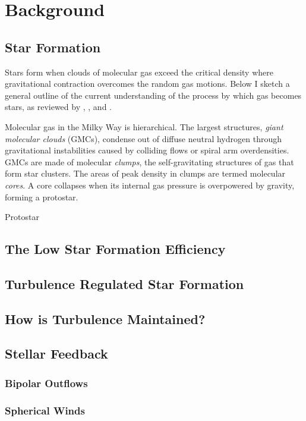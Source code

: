 \section{Background}

\subsection{Star Formation}
Stars form when clouds of molecular gas exceed the critical density where gravitational contraction overcomes the random gas motions. Below I sketch a general outline of the current understanding of the process by which gas becomes stars, as reviewed by \cite{McKee_2007}, \cite{Draine11}, and \cite{Dunham_2014}. 

Molecular gas in the Milky Way is hierarchical. The largest structures, \textit{giant molecular clouds} (GMCs), condense out of diffuse neutral hydrogen through gravitational instabilities caused by colliding flows or spiral arm overdensities. GMCs are made of molecular \textit{clumps}, the self-gravitating structures of gas that form star clusters. The areas of peak density in clumps are termed molecular \textit{cores}. A core collapses when its internal gas pressure is overpowered by gravity, forming a protostar.

Protostar

\subsection{The Low Star Formation Efficiency}

\subsection{Turbulence Regulated Star Formation}

\subsection{How is Turbulence Maintained?}

\subsection{Stellar Feedback}

\subsubsection{Bipolar Outflows}

\subsubsection{Spherical Winds}

